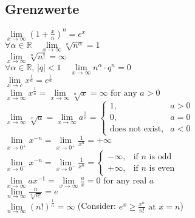 \documentclass[landscape, 10pt]{article}
\newcommand{\R}{\mathbb{R}}
\begin{document}
\begin{multicols}{3}
\subsection{Grenzwerte}
$\lim\limits_{x\to\infty}(1+\frac{x}{n})^n=e^x$\\
$\forall\alpha\in\R\quad\lim\limits_{x\to\infty}\sqrt[n]{n^\alpha}=1$\\
$\lim\limits_{x\to\infty}\sqrt[n]{n!}=\infty$\\
$\forall\alpha\in\R,\,|q|<1\quad\lim\limits_{x\to\infty}n^\alpha\cdot q^n=0$\\
$\lim\limits_{x\to c}x^{\frac{1}{a}}=c^{\frac{1}{a}}$ \\
$\lim\limits_{x\to\infty} x^{\frac{1}{a}}
       =\lim\limits_{x\to\infty}\sqrt[a]{x}
       = \infty \text{ for any } a > 0 $\\
$\lim\limits_{x\to\infty}\sqrt[x]{a}
       =\lim\limits_{x\to\infty}{a}^{\frac{1}{x}}=
       \begin{cases} 1, & a > 0 \\ 0, & a 
       = 0 \\ \text{does not exist}, 
       & a < 0 \end{cases}$\\
$\lim\limits_{x \to 0^+} x^{-n} 
       =\lim\limits_{x \to 0^+} 
       \frac{1}{x^n}= +\infty$\\
$\lim\limits_{x \to 0^-} x^{-n} 
       =\lim\limits_{x \to 0^-} \frac{1}{x^n} 
       =\begin{cases} -\infty, & 
       \text{if } n \text{ is odd} \\ 
       +\infty, & \text{if } n 
       \text{ is even}\end{cases}$\\
$\lim\limits_{x\to\infty} ax^{-1}
       =\lim\limits_{x\to\infty}\frac{a}{x}=0 
       \text{ for any real }a$\\
$\lim\limits_{n\to\infty} \frac{n}{\sqrt[n]{n!}}=e$\\
$\lim\limits_{n\to\infty}\left(n!\right)^{\frac{1}{n}}=\infty$
       (Consider: $e^x\geq \frac{x^n}{n!} \text{ at }
       x=n$)\\


\end{multicols}
\end{document}

